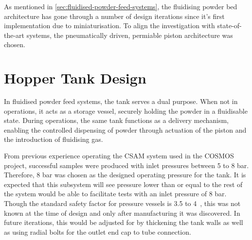 As mentioned in \autoref{sec:fluidised-powder-feed-systems}, the fluidising powder bed architecture has gone through a number of design iterations since it's first implementation due to miniaturisation. To align the investigation with state-of-the-art systems, the pneumatically driven, permiable piston architecture was chosen. 

\section{Hopper Tank Design}
In fluidised powder feed systems, the tank serves a dual purpose. When not in operations, it acts as a storage vessel, securely holding the powder in a fluidisable state. During operations, the same tank functions as a delivery mechanism, enabling the controlled dispensing of powder through actuation of the piston and the introduction of fluidising gas. 

From previous experience operating the CSAM system used in the COSMOS project, successful samples were produced with inlet pressures between 5 to 8 bar. Therefore, 8 bar was chosen as the designed operating pressure for the tank. It is expected that this subsystem will see pressure lower than or equal to the rest of the system would be able to facilitate tests with an inlet pressure of 8 bar. Though the standard safety factor for pressure vessels is 3.5 to 4~\cite{redriver2024asme}, this was not known at the time of design and only after manufacturing it was discovered. In future iterations, this would be adjusted for by thickening the tank walls as well as using radial bolts for the outlet end cap to tube connection.

